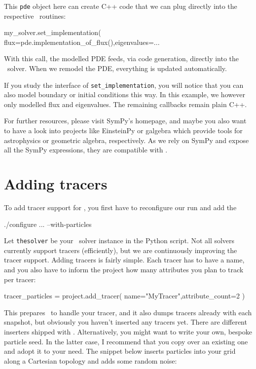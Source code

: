 \noindent
This \texttt{pde} object here can create C++ code that we can plug directly into
the respective \Peano\ routines:
\begin{code}
my_solver.set_implementation( flux=pde.implementation_of_flux(),eigenvalues=...
\end{code}

\noindent
With this call, the modelled PDE feeds, via code generation, directly into the
\ExaHyPE\ solver. When we remodel the PDE, everything is updated automatically.


If you study the interface of \texttt{set\_implementation}, you will notice that
you can also model boundary or initial conditions this way.
In this example, we however only modelled flux and eigenvalues.
The remaining callbacks remain plain C++.


For further resources, please visit SymPy's homepage, and maybe you also want to
have a look into projects like EinsteinPy or galgebra which provide tools for
astrophysics or geometric algebra, respectively.
As we rely on SymPy and expose all the SymPy expressions, they are compatible
with \ExaHyPE.




\section{Adding tracers}

To add tracer support for \ExaHyPE, you first have to reconfigure our run and
add the 
\begin{code}
./configure ... --with-particles
\end{code}

\noindent
Let \texttt{thesolver} be your \ExaHyPE\ solver instance in the Python script.
Not all solvers currently support tracers (efficiently), but we are continuously
improving the tracer support.
Adding tracers is fairly simple.
Each tracer has to have a name, and you also have to inform the project how many
attributes you plan to track per tracer:

\begin{code}
tracer_particles = project.add_tracer( name="MyTracer",attribute_count=2 )
\end{code} 


\noindent
This prepares \ExaHyPE\ to handle your tracer, and it also dumps tracers already
with each snapshot, but obviously you haven't inserted any tracers yet. 
There are different inserters shipped with \ExaHyPE. 
Alternatively, you might want to write your own, bespoke particle seed. 
In the latter case, I recommend that you copy over an existing one and adopt it
to your need.
The snippet below inserts particles into your grid along a Cartesian topology
and adds some random noise:


